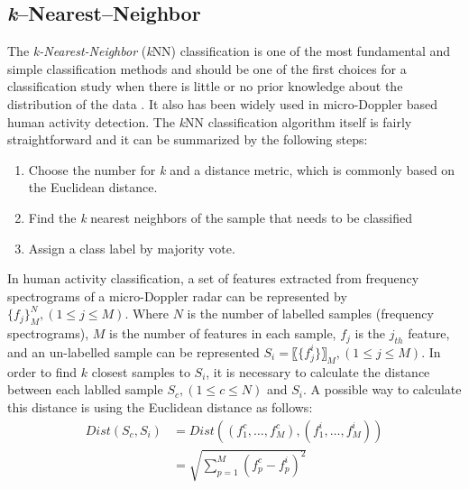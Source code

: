 \subsection{\textit{k}--Nearest--Neighbor}
The \textit{k-Nearest-Neighbor} (\textit{k}NN) classification is one of the most fundamental and simple classification methods and should be one of the first choices for a classification study when there is little or no prior knowledge about the distribution of the data \cite{peterson2009k}. It also has been widely used in micro-Doppler based human activity detection\cite{ccaugliyan2015micro,erol2015kinect,gurbuz2015operational}. The \textit{k}NN classification algorithm itself is fairly straightforward and it can be summarized by the following steps: 
\begin{enumerate}
\item Choose the number for \textit{k} and a distance metric, which is commonly based on the Euclidean distance.
\item Find the \textit{k} nearest neighbors of the sample that needs to be classified
\item Assign a class label by majority vote.
\end{enumerate}

In human activity classification,  a set of features extracted from frequency spectrograms of a micro-Doppler radar can be represented by $\{f_j\}_M^N, (1 \leq j\leq M)$. Where $N$ is the number of labelled samples (frequency spectrograms),  $M$ is the number of features in each sample,  $f_j$ is the $j_{th}$ feature, and an un-labelled sample can be represented $S_i=〖\{f_j^i\} 〗_M, (1\leq j\leq M)$. In order to find $k$ closest samples to $S_i$, it is necessary to calculate the distance between each lablled sample $S_c, (1 \leq c\leq N)$ and $S_i$. A possible way to calculate this distance is using the Euclidean distance as follows:
\begin{equation}
\begin{split}
Dist(S_c,S_i)&=Dist((f_1^c,…,f_M^c ),(f_1^i,\ldots,f_M^i ))\\&=\sqrt{\sum_{p=1}^{M} (f_p^c-f_p^i)^2}
\end{split}
\end{equation}

